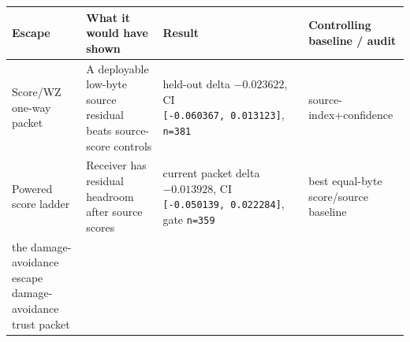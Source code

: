 \documentclass{article}
\begin{document}
\begin{longtable}[]{@{}llll@{}}
\toprule
\begin{minipage}[b]{0.22\columnwidth}\raggedright
Escape\strut
\end{minipage} & \begin{minipage}[b]{0.22\columnwidth}\raggedright
What it would have shown\strut
\end{minipage} & \begin{minipage}[b]{0.22\columnwidth}\raggedright
Result\strut
\end{minipage} & \begin{minipage}[b]{0.22\columnwidth}\raggedright
Controlling baseline / audit\strut
\end{minipage}\tabularnewline
\midrule
\endhead
\begin{minipage}[t]{0.22\columnwidth}\raggedright
Score/WZ one-way packet\strut
\end{minipage} & \begin{minipage}[t]{0.22\columnwidth}\raggedright
A deployable low-byte source residual beats source-score controls\strut
\end{minipage} & \begin{minipage}[t]{0.22\columnwidth}\raggedright
held-out delta \(-0.023622\), CI
\texttt{{[}-0.060367,\ 0.013123{]}}, \texttt{n=381}\strut
\end{minipage} & \begin{minipage}[t]{0.22\columnwidth}\raggedright
source-index+confidence\strut
\end{minipage}\tabularnewline
\begin{minipage}[t]{0.22\columnwidth}\raggedright
Powered score ladder\strut
\end{minipage} & \begin{minipage}[t]{0.22\columnwidth}\raggedright
Receiver has residual headroom after source scores\strut
\end{minipage} & \begin{minipage}[t]{0.22\columnwidth}\raggedright
current packet delta \(-0.013928\), CI
\texttt{{[}-0.050139,\ 0.022284{]}}, gate \texttt{n=359}\strut
\end{minipage} & \begin{minipage}[t]{0.22\columnwidth}\raggedright
best equal-byte score/source baseline\strut
\end{minipage}\tabularnewline
\begin{minipage}[t]{0.22\columnwidth}\raggedright
the damage-avoidance escape damage-avoidance trust packet\strut

\end{minipage}
\end{longtable}
\end{document}

